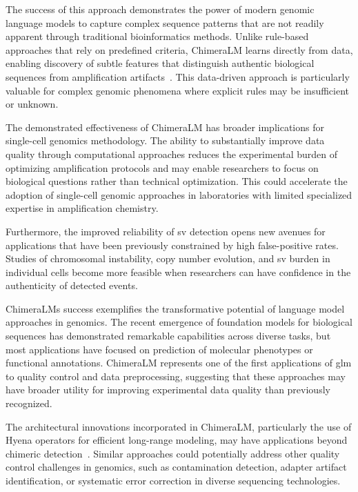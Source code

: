 \documentclass[pdflatex,sn-nature]{sn-jnl}%
\theoremstyle{thmstyleone}%
\theoremstyle{thmstyletwo}%
\theoremstyle{thmstylethree}%
\begin{document}
The success of this approach demonstrates the power of modern genomic language models to capture complex sequence patterns that are not readily apparent through traditional bioinformatics methods.
Unlike rule-based approaches that rely on predefined criteria, ChimeraLM learns directly from data, enabling discovery of subtle features that distinguish authentic biological sequences from amplification artifacts~\cite{lu2023exploration, agyabeng2025evaluating, nguyen2023hyenadna}.
This data-driven approach is particularly valuable for complex genomic phenomena where explicit rules may be insufficient or unknown.

The demonstrated effectiveness of ChimeraLM has broader implications for single-cell genomics methodology.
The ability to substantially improve data quality through computational approaches reduces the experimental burden of optimizing amplification protocols and may enable researchers to focus on biological questions rather than technical optimization.
This could accelerate the adoption of single-cell genomic approaches in laboratories with limited specialized expertise in amplification chemistry.

Furthermore, the improved reliability of \gls{sv} detection opens new avenues for applications that have been previously constrained by high false-positive rates.
Studies of chromosomal instability, copy number evolution, and \gls{sv} burden in individual cells become more feasible when researchers can have confidence in the authenticity of detected events.

ChimeraLM\textquotesingle s success exemplifies the transformative potential of language model approaches in genomics.
The recent emergence of foundation models for biological sequences has demonstrated remarkable capabilities across diverse tasks, but most applications have focused on prediction of molecular phenotypes or functional annotations.
ChimeraLM represents one of the first applications of \gls{glm} to quality control and data preprocessing, suggesting that these approaches may have broader utility for improving experimental data quality than previously recognized.

The architectural innovations incorporated in ChimeraLM, particularly the use of Hyena operators for efficient long-range modeling, may have applications beyond chimeric detection~\cite{Poli2023HyenaHT, nguyen2023hyenadna}.
Similar approaches could potentially address other quality control challenges in genomics, such as contamination detection, adapter artifact identification, or systematic error correction in diverse sequencing technologies.
\end{document}
